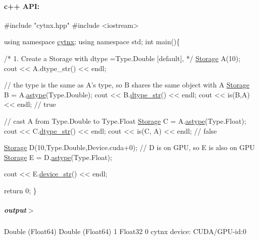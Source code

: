 \paragraph*{c++ A\+PI\+:}


\begin{DoxyCodeInclude}
\textcolor{preprocessor}{#include "cytnx.hpp"}
\textcolor{preprocessor}{#include <iostream>}


\textcolor{keyword}{using namespace }\hyperlink{namespacecytnx}{cytnx};
\textcolor{keyword}{using namespace }std;
\textcolor{keywordtype}{int} main()\{ 

    \textcolor{comment}{/*}
\textcolor{comment}{        1. Create a Storage with }
\textcolor{comment}{        dtype =Type.Double [default],}
\textcolor{comment}{    */}
    \hyperlink{classcytnx_1_1Storage}{Storage} A(10);
    cout << A.dtype\_str() << endl;

    \textcolor{comment}{// the type is the same as A's type, so B shares the same object with A}
    \hyperlink{classcytnx_1_1Storage}{Storage} B = A.\hyperlink{classcytnx_1_1Storage_a8310d8dbb70510272ded2e3d01be25f0}{astype}(Type.Double); 
    cout << B.\hyperlink{classcytnx_1_1Storage_ab6e9fb01ad4655701a2d54dc978eef17}{dtype\_str}() << endl;
    cout << is(B,A) << endl; \textcolor{comment}{// true}

    \textcolor{comment}{// cast A from Type.Double to Type.Float}
    \hyperlink{classcytnx_1_1Storage}{Storage} C = A.\hyperlink{classcytnx_1_1Storage_a8310d8dbb70510272ded2e3d01be25f0}{astype}(Type.Float);
    cout << C.\hyperlink{classcytnx_1_1Storage_ab6e9fb01ad4655701a2d54dc978eef17}{dtype\_str}() << endl;
    cout << is(C, A) << endl; \textcolor{comment}{// false}


    \hyperlink{classcytnx_1_1Storage}{Storage} D(10,Type.Double,Device.cuda+0);
    \textcolor{comment}{// D is on GPU, so E is also on GPU}
    \hyperlink{classcytnx_1_1Storage}{Storage} E = D.\hyperlink{classcytnx_1_1Storage_a8310d8dbb70510272ded2e3d01be25f0}{astype}(Type.Float);

    cout << E.\hyperlink{classcytnx_1_1Storage_ae0d90d5275fa7e52a0a2dc10512ba71f}{device\_str}() << endl; 

 

    \textcolor{keywordflow}{return} 0;
\}

\end{DoxyCodeInclude}
 \subparagraph*{output$>$}


\begin{DoxyVerbInclude}
Double (Float64)
Double (Float64)
1
Float32
0
cytnx device: CUDA/GPU-id:0
\end{DoxyVerbInclude}
